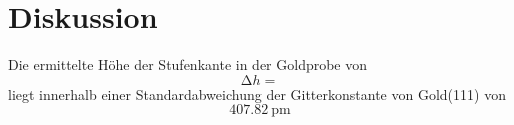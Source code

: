 \section{Diskussion}\label{sec:Diskussion}

Die ermittelte Höhe der Stufenkante in der Goldprobe von 
\begin{equation*}
  \increment h = 
\end{equation*}
liegt innerhalb einer Standardabweichung der Gitterkonstante von Gold(111) von
\begin{equation}
  \SI{407.82}{\pico\meter} 
\end{equation}
